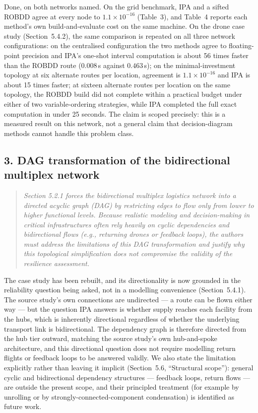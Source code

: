 \documentclass[11pt]{article}
\newenvironment{revcomment}
  {\begin{quote}\itshape\color{gray!60!black}}
  {\end{quote}}
\begin{document}
Done, on both networks named. On the grid benchmark, IPA and a sifted ROBDD agree at every node to $1.1\times10^{-16}$ (Table~3), and Table~4 reports each method's own build-and-evaluate cost on the same machine. On the drone case study (Section~5.4.2), the same comparison is repeated on all three network configurations: on the centralised configuration the two methods agree to floating-point precision and IPA's one-shot interval computation is about 56 times faster than the ROBDD route ($0.008$\,s against $0.463$\,s); on the minimal-investment topology at six alternate routes per location, agreement is $1.1\times10^{-16}$ and IPA is about 15 times faster; at sixteen alternate routes per location on the same topology, the ROBDD build did not complete within a practical budget under either of two variable-ordering strategies, while IPA completed the full exact computation in under 25 seconds. The claim is scoped precisely: this is a measured result on this network, not a general claim that decision-diagram methods cannot handle this problem class.

\subsection*{3. DAG transformation of the bidirectional multiplex network}
\begin{revcomment}
Section 5.2.1 forces the bidirectional multiplex logistics network into a directed acyclic graph (DAG) by restricting edges to flow only from lower to higher functional levels. Because realistic modeling and decision-making in critical infrastructures often rely heavily on cyclic dependencies and bidirectional flows (e.g., returning drones or feedback loops), the authors must address the limitations of this DAG transformation and justify why this topological simplification does not compromise the validity of the resilience assessment.
\end{revcomment}

The case study has been rebuilt, and its directionality is now grounded in the reliability question being asked, not in a modelling convenience (Section~5.4.1). The source study's own connections are undirected --- a route can be flown either way --- but the question IPA answers is whether supply reaches each facility from the hubs, which is inherently directional regardless of whether the underlying transport link is bidirectional. The dependency graph is therefore directed from the hub tier outward, matching the source study's own hub-and-spoke architecture, and this directional question does not require modelling return flights or feedback loops to be answered validly. We also state the limitation explicitly rather than leaving it implicit (Section~5.6, ``Structural scope''): general cyclic and bidirectional dependency structures --- feedback loops, return flows --- are outside the present scope, and their principled treatment (for example by unrolling or by strongly-connected-component condensation) is identified as future work.
\end{document}
